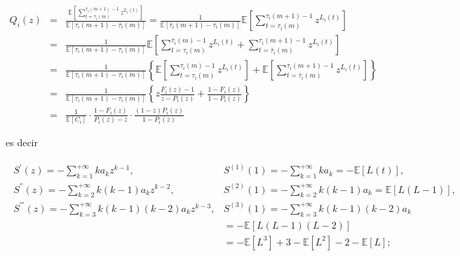 \documentclass{article}
\newcommand{\esp}{\mathbb{E}}
\begin{document}
\begin{eqnarray*}
Q_{i}\left(z\right)&=&\frac{\esp\left[\sum_{t=\tau_{i}\left(m\right)}^{\tau_{i}\left(m+1\right)-1}z^{L_{i}\left(t\right)}\right]}{\esp\left[\tau_{i}\left(m+1\right)-\tau_{i}\left(m\right)\right]}
=\frac{1}{\esp\left[\tau_{i}\left(m+1\right)-\tau_{i}\left(m\right)\right]}
\esp\left[\sum_{t=\tau_{i}\left(m\right)}^{\tau_{i}\left(m+1\right)-1}z^{L_{i}\left(t\right)}\right]\\
&=&\frac{1}{\esp\left[\tau_{i}\left(m+1\right)-\tau_{i}\left(m\right)\right]}
\esp\left[\sum_{t=\tau_{i}\left(m\right)}^{\overline{\tau}_{i}\left(m\right)-1}z^{L_{i}\left(t\right)}
+\sum_{t=\overline{\tau}_{i}\left(m\right)}^{\tau_{i}\left(m+1\right)-1}z^{L_{i}\left(t\right)}\right]\\
&=&\frac{1}{\esp\left[\tau_{i}\left(m+1\right)-\tau_{i}\left(m\right)\right]}\left\{
\esp\left[\sum_{t=\tau_{i}\left(m\right)}^{\overline{\tau}_{i}\left(m\right)-1}z^{L_{i}\left(t\right)}\right]
+\esp\left[\sum_{t=\overline{\tau}_{i}\left(m\right)}^{\tau_{i}\left(m+1\right)-1}z^{L_{i}\left(t\right)}\right]\right\}\\
&=&\frac{1}{\esp\left[\tau_{i}\left(m+1\right)-\tau_{i}\left(m\right)\right]}\left\{
z\frac{F_{i}\left(z\right)-1}{z-P_{i}\left(z\right)}+\frac{1-F_{i}\left(z\right)}{1-P_{i}\left(z\right)}
\right\}\\
&=&\frac{1}{\esp\left[C_{i}\right]}\cdot\frac{1-F_{i}\left(z\right)}{P_{i}\left(z\right)-z}\cdot\frac{\left(1-z\right)P_{i}\left(z\right)}{1-P_{i}\left(z\right)}
\end{eqnarray*}

es decir

\begin{eqnarray}
\begin{array}{ll}
S^{'}\left(z\right)=-\sum_{k=1}^{+\infty}ka_{k}z^{k-1},& S^{(1)}\left(1\right)=-\sum_{k=1}^{+\infty}ka_{k}=-\esp\left[L\left(t\right)\right],\\
S^{''}\left(z\right)=-\sum_{k=2}^{+\infty}k(k-1)a_{k}z^{k-2},& S^{(2)}\left(1\right)=-\sum_{k=2}^{+\infty}k(k-1)a_{k}=\esp\left[L\left(L-1\right)\right],\\
S^{'''}\left(z\right)=-\sum_{k=3}^{+\infty}k(k-1)(k-2)a_{k}z^{k-3},&
S^{(3)}\left(1\right)=-\sum_{k=3}^{+\infty}k(k-1)(k-2)a_{k}\\
&=-\esp\left[L\left(L-1\right)\left(L-2\right)\right]\\
&=-\esp\left[L^{3}\right]+3-\esp\left[L^{2}\right]-2-\esp\left[L\right];
\end{array}
\end{eqnarray}
\end{document}
